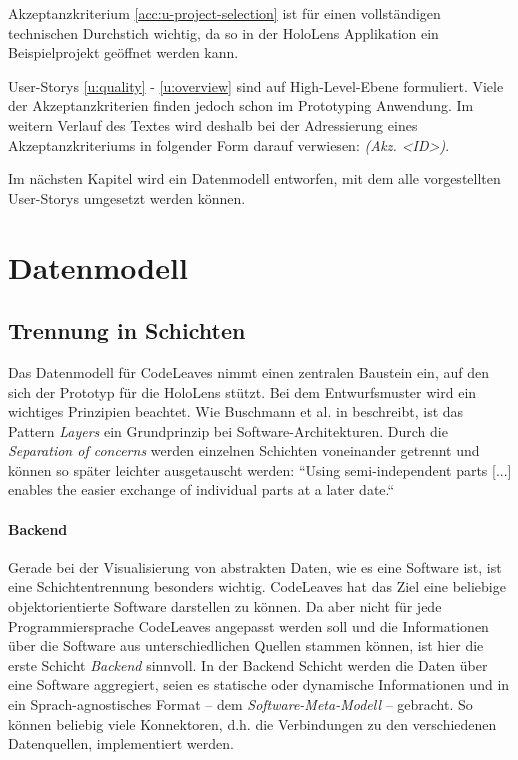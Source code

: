 Akzeptanzkriterium \ref{acc:u-project-selection} ist für einen vollständigen technischen Durchstich wichtig, da so in der HoloLens Applikation ein Beispielprojekt geöffnet werden kann.

User-Storys \ref{u:quality} - \ref{u:overview} sind auf High-Level-Ebene formuliert. Viele der Akzeptanzkriterien finden jedoch schon im Prototyping Anwendung. Im weitern Verlauf des Textes wird deshalb bei der Adressierung eines Akzeptanzkriteriums in folgender Form darauf verwiesen: \textit{(Akz. <ID>)}.

Im nächsten Kapitel wird ein Datenmodell entworfen, mit dem alle vorgestellten User-Storys umgesetzt werden können.

\chapter{Datenmodell}
\label{ch:data-model}
\section{Trennung in Schichten}
\label{ch:data-layers}

Das Datenmodell für CodeLeaves nimmt einen zentralen Baustein ein, auf den sich der Prototyp für die HoloLens stützt. Bei dem Entwurfsmuster wird ein wichtiges Prinzipien beachtet. Wie Buschmann et al. in \cite{frank2007pattern} beschreibt, ist das Pattern \textit{Layers} ein Grundprinzip bei Software-Architekturen. Durch die \textit{Separation of concerns} werden einzelnen Schichten voneinander getrennt und können so später leichter ausgetauscht werden: ``Using semi-independent parts [...] enables the easier exchange of individual parts at a later date.`` \cite{frank2007pattern}

\subsubsection*{Backend}
Gerade bei der Visualisierung von abstrakten Daten, wie es eine Software ist, ist eine Schichtentrennung besonders wichtig. CodeLeaves hat das Ziel eine beliebige objektorientierte Software darstellen zu können. Da aber nicht für jede Programmiersprache CodeLeaves angepasst werden soll und die Informationen über die Software aus unterschiedlichen Quellen stammen können, ist hier die erste Schicht \textit{Backend} sinnvoll. In der Backend Schicht werden die Daten über eine Software aggregiert, seien es statische oder dynamische Informationen und in ein Sprach-agnostisches Format -- dem \textit{Software-Meta-Modell} -- gebracht. So können beliebig viele Konnektoren, d.h. die Verbindungen zu den verschiedenen Datenquellen, implementiert werden.

